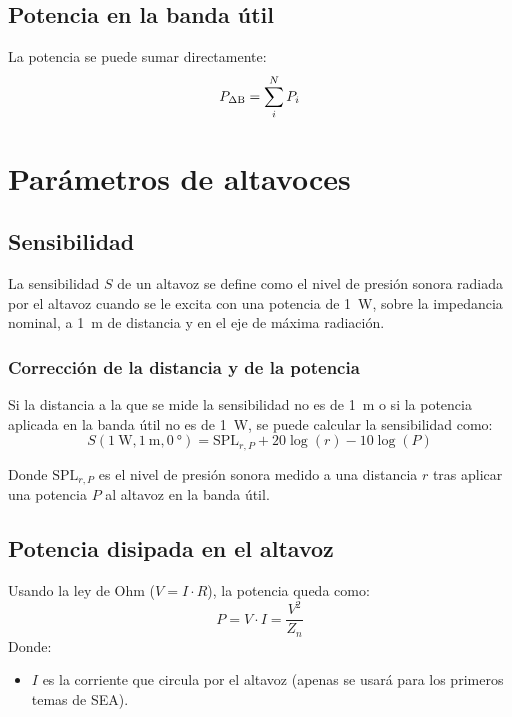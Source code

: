 \documentclass[a4paper, 8pt]{extarticle}
\begin{document}
\begin{multicols}{3}
    \subsection{Potencia en la banda útil}
    La potencia se puede sumar directamente:
    \[
        P_{\Delta \textup{B}} = \sum_{i}^{N} P_i
    \]

    \section{Parámetros de altavoces}
    \subsection{Sensibilidad}
    La sensibilidad $S$ de un altavoz se define como el nivel de presión sonora radiada por el altavoz cuando se le excita con una potencia de \qty{1}{\watt}, sobre la impedancia nominal, a \qty{1}{\meter} de distancia y en el eje de máxima radiación.

    \subsubsection{Corrección de la distancia y de la potencia}
    Si la distancia a la que se mide la sensibilidad no es de \qty{1}{\meter} o si la potencia aplicada en la banda útil no es de \qty{1}{\watt}, se puede calcular la sensibilidad como:
    \[
        S \left( \qty{1}{\watt }, \qty{1}{\meter}, \qty{0}{\degree }  \right) = \text{SPL}_{r,P} + 20 \log \left( r \right) - 10 \log \left( P \right)
    \]

    \color{gray}Donde $\text{SPL}_{r,P}$ es el nivel de presión sonora medido a una distancia $r$ tras aplicar una potencia $P$ al altavoz en la banda útil.\color{black}


    \subsection{Potencia disipada en el altavoz}
    Usando la ley de Ohm ($V=I \cdot R$), la potencia queda como:
    \[ P = V \cdot I = \frac{V^2}{Z_n}\]
    \color{gray}Donde:
    \begin{itemize}
        \item $I$ es la corriente que circula por el altavoz (apenas se usará para los primeros temas de SEA).
    \end{itemize}\color{black}

    \vfill\null
    \columnbreak
    \vfill\null
    \columnbreak
    \vfill\null
    \columnbreak
\end{multicols}
\end{document}
